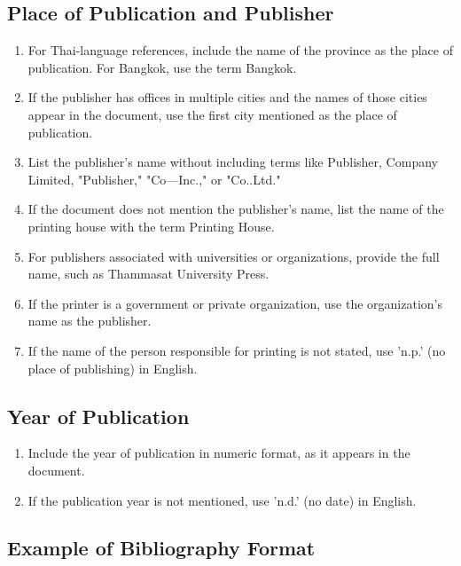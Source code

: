 \subsection{Place of Publication and Publisher}

\begin{enumerate}
    \item For Thai-language references, include the name of the province as the place of publication. For Bangkok, use the term Bangkok.
    \item If the publisher has offices in multiple cities and the names of those cities appear in the document, use the first city mentioned as the place of publication.
    \item List the publisher's name without including terms like Publisher, Company Limited, "Publisher," "Co---Inc.," or "Co..Ltd."
    \item If the document does not mention the publisher's name, list the name of the printing house with the term Printing House.
    \item For publishers associated with universities or organizations, provide the full name, such as Thammasat University Press.
    \item If the printer is a government or private organization, use the organization's name as the publisher.
    \item If the name of the person responsible for printing is not stated, use 'n.p.' (no place of publishing) in English.
\end{enumerate}

\subsection{Year of Publication}

\begin{enumerate}
    \item Include the year of publication in numeric format, as it appears in the document.
    \item If the publication year is not mentioned, use 'n.d.' (no date) in English.
\end{enumerate}

\subsection{Example of Bibliography Format}

